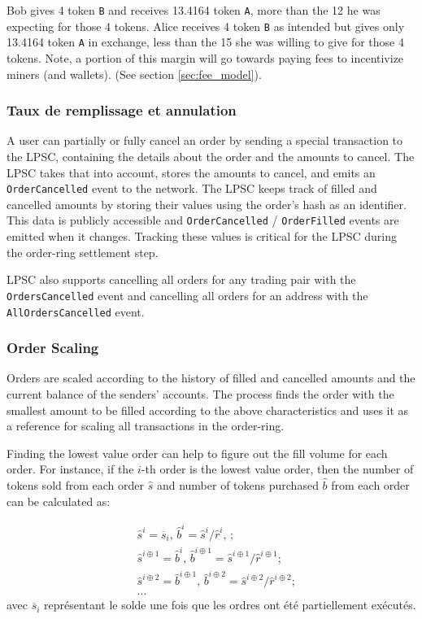 \documentclass[UTF8,nofonts]{article}
\begin{document}
\begin{multicols}{2}
Bob gives 4 token \verb|B| and receives 13.4164 token \verb|A|, more than the 12 he was expecting for those 4 tokens. Alice receives 4 token \verb|B| as intended but gives only 13.4164 token \verb|A| in exchange, less than the 15 she was willing to give for those 4 tokens.
Note, a portion of this margin will go towards paying fees to incentivize miners (and wallets). (See section \ref{sec:fee_model}).

\subsubsection{Taux de remplissage et annulation}

A user can partially or fully cancel an order by sending a special transaction to the LPSC, containing the details about the order and the amounts to cancel. The LPSC takes that into account, stores the amounts to cancel, and emits an \verb|OrderCancelled| event to the network. The LPSC keeps track of filled and cancelled amounts by storing their values using the order's hash as an identifier. This data is publicly accessible and \verb|OrderCancelled| / \verb|OrderFilled| events are emitted when it changes. Tracking these values is critical for the LPSC during the order-ring settlement step.

LPSC also supports cancelling all orders for any trading pair with the \verb|OrdersCancelled| event  and cancelling all orders for an address with the \verb|AllOrdersCancelled| event.


\subsubsection{Order Scaling\label{sec:order_scaling}}
Orders are scaled according to the history of filled and cancelled amounts and the current balance of the senders' accounts. The process finds the order with the smallest amount to be filled according to the above characteristics and uses it as a reference for scaling all transactions in the order-ring.


Finding the lowest value order can help to figure out the fill volume for each order. For instance, if the $i$-th order is the lowest value order, then the number of tokens sold from each order $\hat{s}$ and number of tokens purchased $\hat{b}$ from each order can be calculated as:

\[
\begin{split}
&\hat{s}^{i}=\overline{s}_i\text{, } \hat{b}^{i}=\hat{s}^{i}/ \hat{r}^i\text{, }\text{;}\\
&\hat{s}^{i\oplus 1}=\hat{b}^i\text{, } \hat{b}^{i\oplus 1}=\hat{s}^{i\oplus 1}/ \hat{r}^{i\oplus 1}\text{;}\\
&\hat{s}^{i\oplus 2}=\hat{b}^{i\oplus 1}\text{, } \hat{b}^{i\oplus 2}=\hat{s}^{i\oplus 2}/ \hat{r}^{i\oplus 2}\text{;}\\
& ...
\end{split}
\]
avec $\overline{s}_i$ représentant le solde une fois que les ordres ont été partiellement exécutés. 


\end{multicols}
\end{document}
